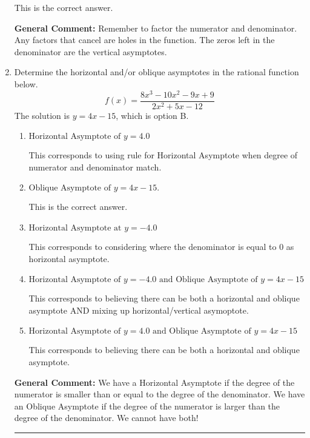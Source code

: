 \documentclass{extbook}[14pt]
\newcommand{\litem}[1]{\item #1

\rule{\textwidth}{0.4pt}}
\begin{document}
\begin{enumerate}
{\begin{enumerate}[label=\Alph*.]
This is the correct answer.
\end{enumerate}

\textbf{General Comment:} Remember to factor the numerator and denominator. Any factors that cancel are holes in the function. The zeros left in the denominator are the vertical asymptotes.
}
\litem{
Determine the horizontal and/or oblique asymptotes in the rational function below.
\[ f(x) = \frac{8x^{3} -10 x^{2} -9 x + 9}{2x^{2} +5 x -12} \]The solution is \( y = 4x -15 \), which is option B.\begin{enumerate}[label=\Alph*.]
\item \( \text{Horizontal Asymptote of } y = 4.0  \)

This corresponds to using rule for Horizontal Asymptote when degree of numerator and denominator match.
\item \( \text{Oblique Asymptote of } y = 4x -15. \)

This is the correct answer.
\item \( \text{Horizontal Asymptote at } y = -4.0 \)

This corresponds to considering where the denominator is equal to 0 as horizontal asymptote.
\item \( \text{Horizontal Asymptote of } y = -4.0 \text{ and Oblique Asymptote of } y = 4x -15 \)

This corresponds to believing there can be both a horizontal and oblique asymptote AND mixing up horizontal/vertical asymoptote.
\item \( \text{Horizontal Asymptote of } y = 4.0 \text{ and Oblique Asymptote of } y = 4x -15 \)

This corresponds to believing there can be both a horizontal and oblique asymptote.
\end{enumerate}

\textbf{General Comment:} We have a Horizontal Asymptote if the degree of the numerator is smaller than or equal to the degree of the denominator. We have an Oblique Asymptote if the degree of the numerator is larger than the degree of the denominator. We cannot have both!
}
\end{enumerate}
\end{document}
